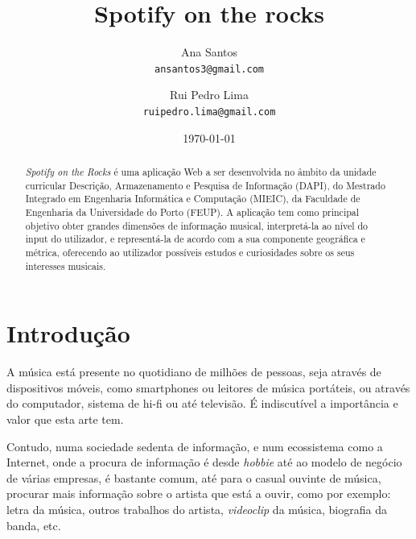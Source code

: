 \documentclass[twocolumn,twoside,11pt,a4paper]{article}
\title{\vspace{-15mm}\fontsize{24pt}{10pt}\selectfont\textbf{Spotify on the rocks}}
\author{Ana Santos\\
\small \texttt{ansantos3@gmail.com}\\
\and
Rui Pedro Lima\\
\small \texttt{ruipedro.lima@gmail.com}
\vspace{-5mm}
}
\date{\today}
\begin{document}
\maketitle
\thispagestyle{plain}            %


\begin{abstract}


\textit{Spotify on the Rocks} é uma aplicação Web a ser desenvolvida no âmbito da unidade curricular Descrição, Armazenamento e Pesquisa de Informação (DAPI), do Mestrado Integrado em Engenharia Informática e Computação (MIEIC), da Faculdade de Engenharia da Universidade do Porto (FEUP).
A aplicação tem como principal objetivo obter grandes dimensões de informação musical, interpretá-la ao nível do input do utilizador, e representá-la de acordo com a sua componente geográfica e métrica, oferecendo ao utilizador possíveis estudos e curiosidades sobre os seus interesses musicais.

\end{abstract}


\section{Introdução}\label{sec:intro}


A música está presente no quotidiano de milhões de pessoas, seja através de
dispositivos móveis, como smartphones ou leitores de música portáteis, ou através do
computador, sistema de hi-fi ou até televisão. É indiscutível a importância e valor
que esta arte tem.

Contudo, numa sociedade sedenta de informação, e num ecossistema como a Internet, onde
a procura de informação é desde \textit{hobbie} até ao modelo de negócio de várias empresas,
é bastante comum, até para o casual ouvinte de música, procurar mais informação
sobre o artista que está a ouvir, como por exemplo: letra da música, outros trabalhos
do artista, \textit{videoclip} da música, biografia da banda, etc.
\end{document}
